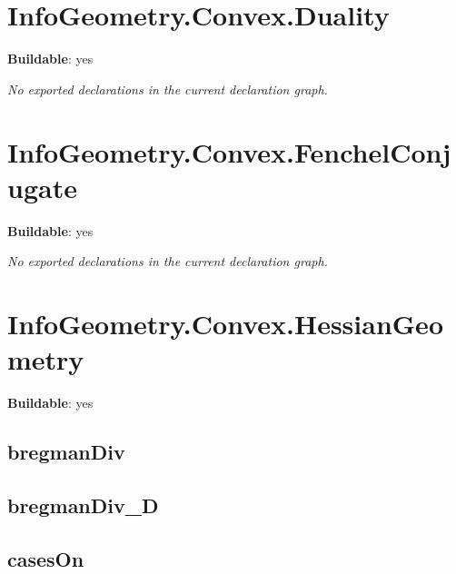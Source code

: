 \section{InfoGeometry.Convex.Duality}

\noindent\textbf{Buildable}: yes

\noindent\emph{No exported declarations in the current declaration graph.}

\section{InfoGeometry.Convex.FenchelConjugate}

\noindent\textbf{Buildable}: yes

\noindent\emph{No exported declarations in the current declaration graph.}

\section{InfoGeometry.Convex.HessianGeometry}

\noindent\textbf{Buildable}: yes

\subsection*{bregmanDiv}

\begin{theorem}[blueprint="infogeometry:convex:hessiangeometry:bregmandiv"]
\end{theorem}

\subsection*{bregmanDiv_D}

\begin{theorem}[blueprint="infogeometry:convex:hessiangeometry:bregmandiv_d"]
\end{theorem}

\subsection*{casesOn}

\begin{theorem}[blueprint="infogeometry:convex:hessiangeometry:caseson"]
\end{theorem}

